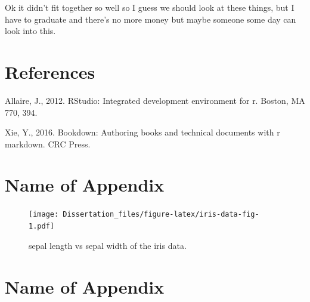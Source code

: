 \documentclass[
  10pt,
]{report}
\newlength{\cslhangindent}
\newlength{\cslentryspacingunit} %
\newenvironment{CSLReferences}[2] %
 {%
  \setlength{\parindent}{0pt}
  \ifodd #1
  \let\oldpar\par
  \def\par{\hangindent=\cslhangindent\oldpar}
  \fi
  \setlength{\parskip}{#2\cslentryspacingunit}
 }%
 {}
\begin{document}
Ok it didn't fit together so well so I guess we should look at these things, but I have to graduate and there's no more money but maybe someone some day can look into this.

\hypertarget{references}{%
\chapter*{References}\label{references}}

\hypertarget{refs}{}
\begin{CSLReferences}{1}{0}
\leavevmode{}%
Allaire, J., 2012. RStudio: Integrated development environment for r. Boston, MA 770, 394.

\leavevmode{}%
Xie, Y., 2016. Bookdown: Authoring books and technical documents with r markdown. CRC Press.

\end{CSLReferences}

\hypertarget{appendix-appendix}{%
\appendix}


\hypertarget{name-of-appendix}{%
\chapter{Name of Appendix}\label{name-of-appendix}}

\begin{figure}
\centering
\texttt{[image: Dissertation\_files/figure-latex/iris-data-fig-1.pdf]}
\caption{\label{fig:iris-data-fig}sepal length vs sepal width of the iris data.}
\end{figure}

\hypertarget{name-of-appendix-1}{%
\chapter{Name of Appendix}\label{name-of-appendix-1}}
\end{document}
